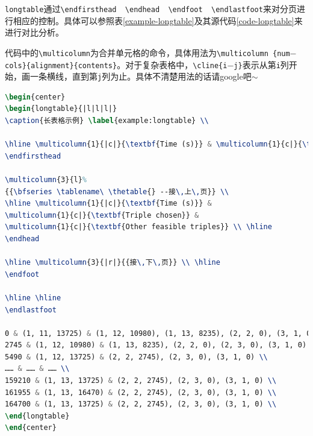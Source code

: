 \texttt{longtable}通过\texttt{\textbackslash endfirsthead~~\textbackslash endhead~~\textbackslash endfoot~~\textbackslash endlastfoot}来对分页进行相应的控制。具体可以参照表\ref{example-longtable}及其源代码\ref{code-longtable}来进行对比分析。\par
代码中的\texttt{\textbackslash multicolumn}为合并单元格的命令，具体用法为\texttt{\textbackslash multicolumn \{num$-$cols\}\{alignment\}\{contents\}}。对于复杂表格中，\texttt{\textbackslash cline\{i$-$j\}}表示从第\texttt{i}列开始，画一条横线，直到第\texttt{j}列为止。具体不清楚用法的话请google吧$\sim$\par
\begin{lstlisting}[caption={跨页表格示例},label={code-longtable},language={LaTeX}]
\begin{center}
\begin{longtable}{|l|l|l|}
\caption{长表格示例} \label{example:longtable} \\

\hline \multicolumn{1}{|c|}{\textbf{Time (s)}} & \multicolumn{1}{c|}{\textbf{Triple chosen}} & \multicolumn{1}{c|}{\textbf{Other feasible triples}} \\ \hline 
\endfirsthead

\multicolumn{3}{l}%
{{\bfseries \tablename\ \thetable{} --接\,上\,页}} \\
\hline \multicolumn{1}{|c|}{\textbf{Time (s)}} &
\multicolumn{1}{c|}{\textbf{Triple chosen}} &
\multicolumn{1}{c|}{\textbf{Other feasible triples}} \\ \hline
\endhead

\hline \multicolumn{3}{|r|}{{接\,下\,页}} \\ \hline
\endfoot

\hline \hline
\endlastfoot

0 & (1, 11, 13725) & (1, 12, 10980), (1, 13, 8235), (2, 2, 0), (3, 1, 0) \\
2745 & (1, 12, 10980) & (1, 13, 8235), (2, 2, 0), (2, 3, 0), (3, 1, 0) \\
5490 & (1, 12, 13725) & (2, 2, 2745), (2, 3, 0), (3, 1, 0) \\
…… & …… & …… \\
159210 & (1, 13, 13725) & (2, 2, 2745), (2, 3, 0), (3, 1, 0) \\
161955 & (1, 13, 16470) & (2, 2, 2745), (2, 3, 0), (3, 1, 0) \\
164700 & (1, 13, 13725) & (2, 2, 2745), (2, 3, 0), (3, 1, 0) \\
\end{longtable}
\end{center}
\end{lstlisting}
